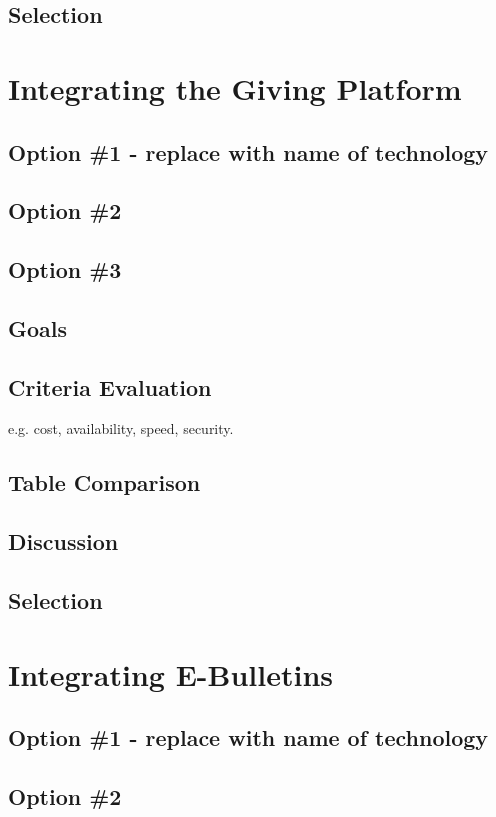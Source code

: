 \documentclass[letterpaper,10pt,draftclsnofoot,onecolumn,titlepage]{IEEEtran}
\begin{document}
	\subsection{Selection}
	
	\section{Integrating the Giving Platform}
	\subsection{Option \#1 - replace with name of technology}
	\subsection{Option \#2}
	\subsection{Option \#3}
	\subsection{Goals}
	\subsection{Criteria Evaluation}
	e.g. cost, availability, speed, security.
	\subsection{Table Comparison}
	\subsection{Discussion}
	\subsection{Selection}
	
	\section{Integrating E-Bulletins}
	\subsection{Option \#1 - replace with name of technology}
	\subsection{Option \#2}
\end{document}
